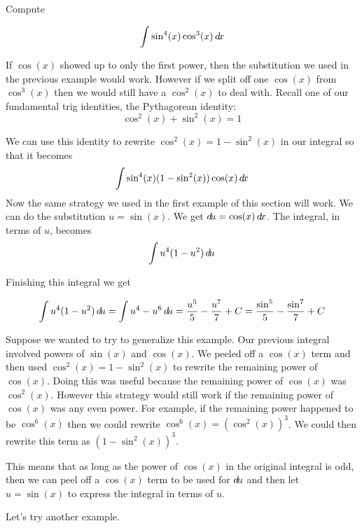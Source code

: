 \documentclass{ximera}
\begin{document}
\begin{example}
Compute

\[ 
\int \sin^{4}(x) \cos^{3}(x) \mathop{}\!d\! x 
\]

\begin{explanation}
 If $\cos(x)$ showed up to only the first power, then the substitution we used in the previous example would work. However if we split off one  $\cos(x)$ from $\cos^{3}(x)$ then we would still have a $\cos^{2}(x)$ to deal with. Recall one of our fundamental trig identities, the Pythagorean identity:
\[
\cos^{2}(x) + \sin^{2}(x)=1
\]

We can use this identity to rewrite $\cos^{2}(x)=1-\sin^{2}(x)$ in our integral so that it becomes
\[
\int \sin^{4}(x) (1-\sin^{2}(x)) \cos(x) \mathop{}\!d\! x
\]
Now the same strategy we used in the first example of this section will work. We can do the substitution $u=\sin(x)$. We get $\mathop{}\!d\! u= \cos(x) \mathop{}\!d\! x$. 
The integral, in terms of $u$, becomes
\[ 
\int u^{4}(1-u^{2}) \mathop{}\!d\! u
\]

Finishing this integral we get 

\[ 
\int u^{4}(1-u^{2}) \mathop{}\!d\! u= \int u^{4}-u^{6} \mathop{}\!d\! u = \frac{u^{5}}{5} - \frac{u^{7}}{7} + C =\frac{ \sin^{5}}{5} - \frac{ \sin^{7}}{7} + C
\]

\end{explanation}
\end{example}

Suppose we wanted to try to generalize this example. Our previous integral involved powers of $\sin(x)$ and $\cos(x)$. We peeled off a $\cos(x)$ term and then used $\cos^{2}(x)=1-\sin^{2}(x)$ to rewrite the remaining power of $\cos(x)$. Doing this was useful because the remaining power of $\cos(x)$ was $\cos^{2}(x)$. However this strategy would still work if the remaining power of $\cos(x)$ was any even power. For example, if the remaining power happened to be $\cos^{6}(x)$ then we could rewrite $\cos^{6}(x)=(\cos^{2}(x))^{3}$. We could then rewrite this term as $(1-\sin^{2}(x))^{3}$. 

This means that as long as the power of $\cos(x)$ in the original integral is odd, then we can peel off a $\cos(x)$ term to be used for $\mathop{}\!d\! u$ and then let $u=\sin(x)$ to express the integral in terms of $u$. 

Let's try another example.
\end{document}
